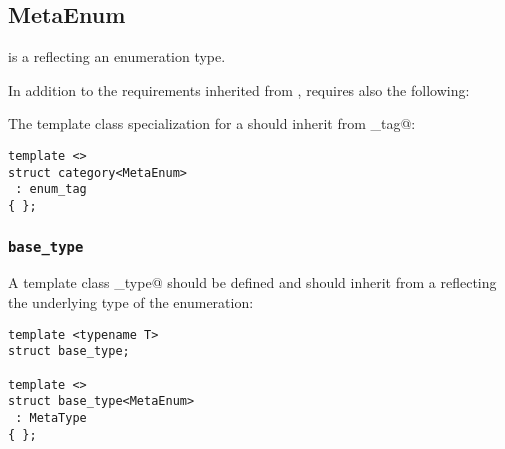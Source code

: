 \subsection{MetaEnum}
\label{concept-MetaEnum}

 is a  reflecting an enumeration type.

In addition to the requirements inherited from ,  requires
also the following:

The \verb@category@ template class specialization for a  should
inherit from \verb@enum_tag@:

\begin{verbatim}
template <>
struct category<MetaEnum>
 : enum_tag
{ };
\end{verbatim}

\subsubsection{\texttt{base\_type}}

A template class \verb@base_type@ should be defined and should inherit from
a  reflecting the underlying type of the enumeration:

\begin{verbatim}
template <typename T>
struct base_type;

template <>
struct base_type<MetaEnum>
 : MetaType
{ };
\end{verbatim}

